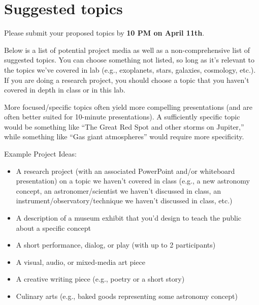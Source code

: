 \documentclass[11pt]{article}
\begin{document}
\section{Suggested topics}

Please submit your proposed topics by \textbf{10 PM on April 11th}. \bigskip
 
 \noindent
 Below is a list of potential project media as well as a non-comprehensive list of suggested topics.  You can choose something not listed, so long as it's relevant to the topics we've covered in lab (e.g., exoplanets, stars, galaxies, cosmology, etc.). If you are doing a research project, you should choose a topic that you haven't covered in depth in class or in this lab.

\medskip \noindent
More focused/specific topics often yield more compelling presentations (and are often better suited for 10-minute presentations). A sufficiently specific topic would be something like ``The Great Red Spot and other storms on Jupiter,'' while something like ``Gas giant atmospheres'' would require more specificity.

\bigskip \noindent
Example Project Ideas:
\begin{itemize}[noitemsep]
    \item A research project (with an associated PowerPoint and/or whiteboard presentation) on a topic we haven't covered in class (e.g., a new astronomy concept, an astronomer/scientist we haven’t discussed in class, an instrument/observatory/technique we haven’t discussed in class, etc.)
    \item A description of a museum exhibit that you'd design to teach the public about a specific concept
    \item A short performance, dialog, or play (with up to 2 participants)
    \item A visual, audio, or mixed-media art piece
    \item A creative writing piece (e.g., poetry or a short story)
    \item Culinary arts (e.g., baked goods representing some astronomy concept)

\end{itemize}
\end{document}
